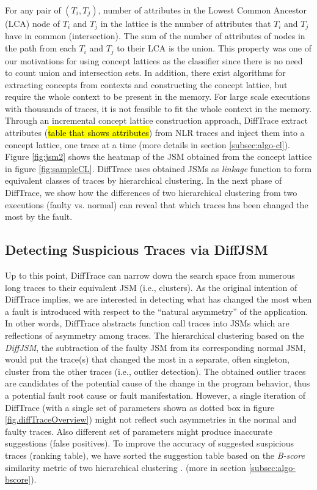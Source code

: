 For any pair of $(T_i,T_j)$, number of attributes in the Lowest Common Ancestor (LCA) node of $T_i$ and $T_j$ in the lattice is the number of attributes that $T_i$ and $T_j$ have in common (intersection). The sum of the number of attributes of nodes in the path from each $T_i$ and $T_j$ to their LCA is the union. This property was one of our motivations for using concept lattices as the classifier since there is no need to count union and intersection sets. 
%
In addition, there exist algorithms for extracting concepts from contexts and constructing the concept lattice, but require the whole context to be present in the memory. 
%
For large scale executions with thousands of traces, it is not feasible to fit the whole context in the memory.
%
Through an incremental concept lattice construction approach, DiffTrace extract attributes (\hl{table that shows attributes}) from NLR traces and inject them into a concept lattice, one trace at a time (more details in section \ref{subsec:algo-cl}).
%
Figure \ref{fig:jsm2} shows the heatmap of the JSM obtained from the concept lattice in figure \ref{fig:sampleCL}.
%
DiffTrace uses obtained JSMs as \textit{linkage} function to form equivalent classes of traces by hierarchical clustering.
%
In the next phase of DiffTrace, we show how the differences of two hierarchical clustering from two executions (faulty vs. normal) can reveal that which traces has been changed the most by the fault.



\subsection{Detecting Suspicious Traces via DiffJSM}
Up to this point, DiffTrace can narrow down the search space from numerous long traces to their equivalent JSM (i.e., clusters).
%
As the original intention of DiffTrace implies, we are interested in detecting what has changed the most when a fault is introduced with respect to the ``natural asymmetry'' of the application.
%
In other words, DiffTrace abstracts function call traces into JSMs which are reflections of asymmetry among traces. The hierarchical clustering based on the \textit{DiffJSM}, the subtraction of the faulty JSM from its corresponding normal JSM, would put the trace(s) that changed the most in a separate, often singleton, cluster from the other traces (i.e., outlier detection).
% 
The obtained outlier traces are candidates of the potential cause of the change in the program behavior, thus a potential fault root cause or fault manifestation.
%
However, a single iteration of DiffTrace (with a single set of parameters shown as dotted box in figure \ref{fig.diffTraceOverview}) might not reflect such asymmetries in the normal and faulty traces. 
%
Also different set of parameters might produce inaccurate suggestions (false positives).
%
To improve the accuracy of suggested suspicious traces (ranking table), we have sorted the suggestion table based on the \textit{B-score} similarity metric of two hierarchical clustering \cite{fowlkes83}. (more in section \ref{subsec:algo-bscore}).

